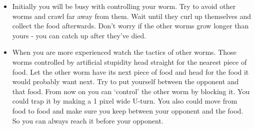 \begin{itemize}

\item Initially you will be busy with controlling your worm. Try to
avoid other worms and crawl far away from them. Wait until they curl up
themselves and collect the food afterwards. Don't worry if the other
worms grow longer than yours {}- you can catch up after they've died. 

\item When you are more experienced watch the tactics of other worms.
Those worms controlled by artificial stupidity head straight for the
nearest piece of food. Let the other worm have its next piece of food
and head for the food it would probably want next. Try to put yourself
between the opponent and that food. From now on you can `control' the
other worm by blocking it. You could trap it by making a 1 pixel wide
U{}-turn. You also could move from food to food and make sure you keep
between your opponent and the food. So you can always reach it before
your opponent. 

\end{itemize}
